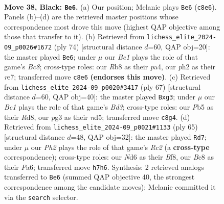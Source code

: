 \documentclass[11pt]{article}
\begin{document}
\clearpage

\begin{figure}[p]\centering
\begin{subfigure}{0.46\textwidth}\centering
\resizebox{\linewidth}{!}{%
\newchessgame
\chessboard[
  setfen={1rb2k2/2R4p/3n4/1p4p1/r7/4P1P1/P4PKP/B3R3 b - - 1 38},
  showmover=false,
  pgfstyle=straightmove, color=movearrow, markmove={c8-e6}
]}
\caption{}
\end{subfigure}\hfill
\begin{subfigure}{0.46\textwidth}\centering
\resizebox{\linewidth}{!}{%
\newchessgame
\chessboard[
  setfen={r1B5/4r2p/2Rp1bk1/3P2p1/pR3p2/3P1P2/KP5P/8 w - - 14 38},
  showmover=false,
  pgfstyle=straightmove, color=movearrow, markmove={c8-e6}
]}
\caption{}
\end{subfigure}
\\[4pt]
\begin{subfigure}{0.46\textwidth}\centering
\resizebox{\linewidth}{!}{%
\newchessgame
\chessboard[
  setfen={3r4/7k/2Rb4/3N1prp/3B4/4P1P1/PP3P2/R5K1 b - - 0 34},
  showmover=false,
  pgfstyle=straightmove, color=movearrow, markmove={d6-g3}
]}
\caption{}
\end{subfigure}\hfill
\begin{subfigure}{0.46\textwidth}\centering
\resizebox{\linewidth}{!}{%
\newchessgame
\chessboard[
  setfen={5bk1/2r5/pR5p/1p4p1/r7/5P1P/P3R1PK/B7 b - - 6 33},
  showmover=false,
  pgfstyle=straightmove, color=movearrow, markmove={c7-d7}
]}
\caption{}
\end{subfigure}
\caption{\textbf{Move 38, Black: \texttt{Be6}.} (a) Our position; Melanie plays \texttt{Be6} (\texttt{c8e6}). Panels (b)--(d) are the retrieved master positions whose correspondence most drove this move (highest QAP objective among those that transfer to it). (b) Retrieved from \texttt{lichess\_elite\_2024-09\_p0026\#1672} (ply 74) [structural distance $d$=60, QAP obj=20]: the master played \texttt{Be6}; under $\mu$ our \emph{Bc1} plays the role of that game's \emph{Bc8}; cross-type roles: our \emph{R}b8 as their \emph{p}a4, our \emph{p}h2 as their \emph{r}e7; transferred move \texttt{c8e6} \textbf{(endorses this move)}. (c) Retrieved from \texttt{lichess\_elite\_2024-09\_p0020\#3417} (ply 67) [structural distance $d$=60, QAP obj=40]: the master played \texttt{Bxg3}; under $\mu$ our \emph{Bc1} plays the role of that game's \emph{Bd3}; cross-type roles: our \emph{P}b5 as their \emph{R}d8, our \emph{p}g3 as their \emph{n}d5; transferred move \texttt{c8g4}. (d) Retrieved from \texttt{lichess\_elite\_2024-09\_p0021\#1133} (ply 65) [structural distance $d$=48, QAP obj=32]: the master played \texttt{Rd7}; under $\mu$ our \emph{Ph2} plays the role of that game's \emph{Rc2} (a \textbf{cross-type} correspondence); cross-type roles: our \emph{N}d6 as their \emph{B}f8, our \emph{B}c8 as their \emph{P}a6; transferred move \texttt{h7h6}. Synthesis: 2 retrieved analogs transferred to \texttt{Be6} (summed QAP objective 40, the strongest correspondence among the candidate moves); Melanie committed it via the \texttt{search} selector.}
\label{fig:thought-m75}
\end{figure}
\end{document}

